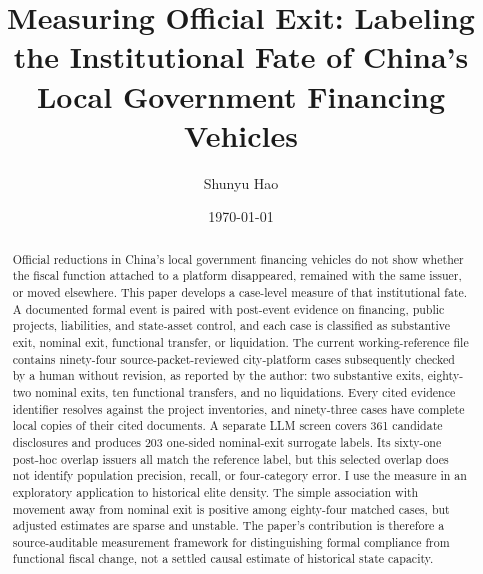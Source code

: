 \documentclass[12pt]{article}
\title{Measuring Official Exit: Labeling the Institutional Fate of China's Local Government Financing Vehicles}
\author{Shunyu Hao}
\date{\today}
\begin{document}
\maketitle

\begin{abstract}
Official reductions in China's local government financing vehicles do not show
whether the fiscal function attached to a platform disappeared, remained with
the same issuer, or moved elsewhere. This paper develops a case-level measure
of that institutional fate. A documented formal event is paired with
post-event evidence on financing, public projects, liabilities, and state-asset
control, and each case is classified as substantive exit, nominal exit,
functional transfer, or liquidation. The current working-reference file contains
ninety-four source-packet-reviewed city-platform cases subsequently checked
by a human without revision, as reported by the author: two substantive exits,
eighty-two nominal exits, ten functional transfers, and no liquidations. Every
cited evidence identifier resolves against the project inventories, and
ninety-three cases have complete local copies of their cited documents. A
separate LLM screen covers 361 candidate disclosures and produces 203
one-sided nominal-exit surrogate labels. Its sixty-one post-hoc overlap issuers
all match the reference label, but this selected overlap does not identify
population precision, recall, or four-category error. I use the measure in an
exploratory application to historical elite density. The simple association
with movement away from nominal exit is positive among eighty-four matched
cases, but adjusted estimates are sparse and unstable. The paper's contribution
is therefore a source-auditable measurement framework for distinguishing formal
compliance from functional fiscal change, not a settled causal estimate of
historical state capacity.
\end{abstract}










\appendix

\clearpage



\end{document}
